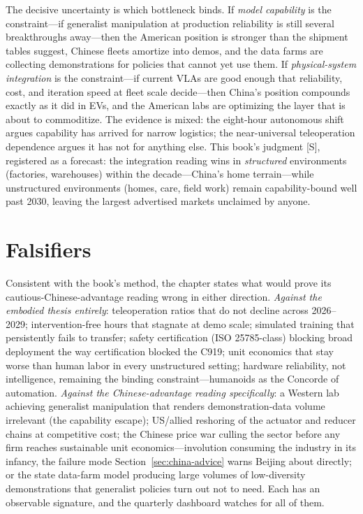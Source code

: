 The decisive uncertainty is which bottleneck binds. If \emph{model capability} is the constraint---if generalist manipulation at production reliability is still several breakthroughs away---then the American position is stronger than the shipment tables suggest, Chinese fleets amortize into demos, and the data farms are collecting demonstrations for policies that cannot yet use them. If \emph{physical-system integration} is the constraint---if current VLAs are good enough that reliability, cost, and iteration speed at fleet scale decide---then China's position compounds exactly as it did in EVs, and the American labs are optimizing the layer that is about to commoditize. The evidence is mixed: the eight-hour autonomous shift argues capability has arrived for narrow logistics; the near-universal teleoperation dependence argues it has not for anything else. This book's judgment [S], registered as a forecast: the integration reading wins in \emph{structured} environments (factories, warehouses) within the decade---China's home terrain---while unstructured environments (homes, care, field work) remain capability-bound well past 2030, leaving the largest advertised markets unclaimed by anyone.

\section{Falsifiers}
\label{sec:embodied-falsifiers}

Consistent with the book's method, the chapter states what would prove its cautious-Chinese-advantage reading wrong in either direction. \emph{Against the embodied thesis entirely}: teleoperation ratios that do not decline across 2026--2029; intervention-free hours that stagnate at demo scale; simulated training that persistently fails to transfer; safety certification (ISO 25785-class) blocking broad deployment the way certification blocked the C919; unit economics that stay worse than human labor in every unstructured setting; hardware reliability, not intelligence, remaining the binding constraint---humanoids as the Concorde of automation. \emph{Against the Chinese-advantage reading specifically}: a Western lab achieving generalist manipulation that renders demonstration-data volume irrelevant (the capability escape); US/allied reshoring of the actuator and reducer chains at competitive cost; the Chinese price war culling the sector before any firm reaches sustainable unit economics---involution consuming the industry in its infancy, the failure mode Section~\ref{sec:china-advice} warns Beijing about directly; or the state data-farm model producing large volumes of low-diversity demonstrations that generalist policies turn out not to need. Each has an observable signature, and the quarterly dashboard watches for all of them.

